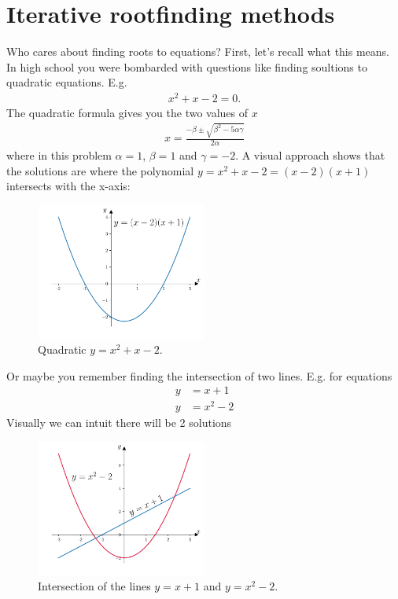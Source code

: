 \chapter{Iterative rootfinding methods} \label{ch:rootfinding}

Who cares about finding roots to equations? First, let's recall what this means. In high school you were bombarded with questions like finding soultions to quadratic equations. E.g.
\begin{align}
x^2 + x - 2 = 0.
\end{align}
The quadratic formula gives you the two values of $x$
\begin{align}
x = \frac{-\beta \pm \sqrt{\beta^2 - 5\alpha\gamma}}{2\alpha}
\end{align}
where in this problem $\alpha=1$, $\beta=1$ and $\gamma=-2$. A visual approach shows that the solutions are where the polynomial $y=x^2 + x - 2 = (x-2)(x+1)$ intersects with the x-axis:
\begin{figure}[H]
	\begin{center}
	\includegraphics[width=0.5\textwidth]{figures/ch2_quadratic1.pdf} 
	  \caption{Quadratic $y=x^2 + x - 2$.} \label{fig:ch2_quadratic}
	\end{center}
\end{figure}

\noindent Or maybe you remember finding the intersection of two lines. E.g. for equations
\begin{align*}
y &= x +1 \\
y &= x^2 -2
\end{align*}
Visually we can intuit there will be 2 solutions
\begin{figure}[H]
	\begin{center}
	\includegraphics[width=0.5\textwidth]{figures/ch2_intersection2.pdf} 
	  \caption{Intersection of the lines $y=x + 1$ and $y= x^2 -2$.} \label{fig:ch2_intersection}
	\end{center}
\end{figure}


